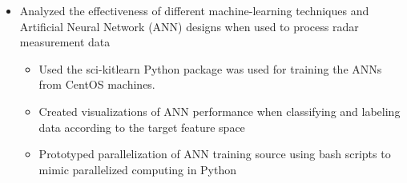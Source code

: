 \documentclass[10pt,a4paper]{article}
\begin{document}
\noindent{}
\smallskip

\begin{itemize}
  \item Analyzed the effectiveness of different machine-learning techniques and
    Artificial Neural Network (ANN) designs when used to process radar measurement
    data
  \begin{itemize}
    \item Used the sci-kitlearn Python package was used for training the ANNs from
      CentOS machines.
    \item Created visualizations of ANN performance when classifying and
      labeling data according to the target feature space
    \item Prototyped parallelization of ANN training source using bash
      scripts to mimic parallelized computing in Python
  \end{itemize}
\end{itemize}
\end{document}
